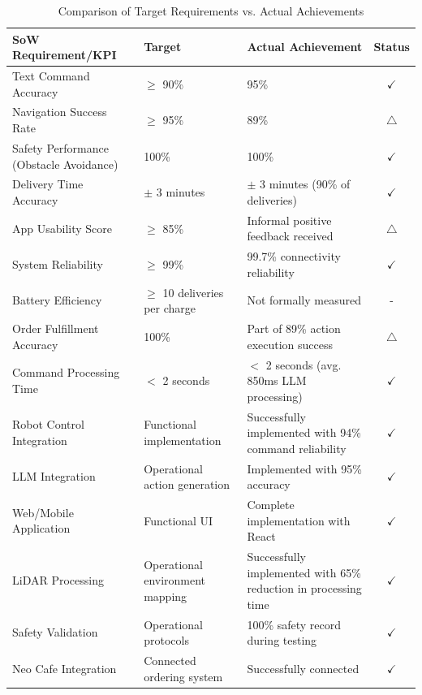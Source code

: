 \documentclass[12pt]{article}
\begin{document}
\renewcommand{\arraystretch}{1.2}
\begin{table}[h]
\centering
\begin{tabularx}{\textwidth}{|X|X|X|c|}
\hline
\textbf{SoW Requirement/KPI} & \textbf{Target} & \textbf{Actual Achievement} & \textbf{Status} \\
\hline
Text Command Accuracy & $\geq$ 90\% & 95\% & $\checkmark$ \\
\hline
Navigation Success Rate & $\geq$ 95\% & 89\% & $\triangle$ \\
\hline
Safety Performance (Obstacle Avoidance) & 100\% & 100\% & $\checkmark$ \\
\hline
Delivery Time Accuracy & $\pm$ 3 minutes & $\pm$ 3 minutes (90\% of deliveries) & $\checkmark$ \\
\hline
App Usability Score & $\geq$ 85\% & Informal positive feedback received & $\triangle$ \\
\hline
System Reliability & $\geq$ 99\% & 99.7\% connectivity reliability & $\checkmark$ \\
\hline
Battery Efficiency & $\geq$ 10 deliveries per charge & Not formally measured & - \\
\hline
Order Fulfillment Accuracy & 100\% & Part of 89\% action execution success & $\triangle$ \\
\hline
Command Processing Time & $<$ 2 seconds & $<$ 2 seconds (avg. 850ms LLM processing) & $\checkmark$ \\
\hline
Robot Control Integration & Functional implementation & Successfully implemented with 94\% command reliability & $\checkmark$ \\
\hline
LLM Integration & Operational action generation & Implemented with 95\% accuracy & $\checkmark$ \\
\hline
Web/Mobile Application & Functional UI & Complete implementation with React & $\checkmark$ \\
\hline
LiDAR Processing & Operational environment mapping & Successfully implemented with 65\% reduction in processing time & $\checkmark$ \\
\hline
Safety Validation & Operational protocols & 100\% safety record during testing & $\checkmark$ \\
\hline
Neo Cafe Integration & Connected ordering system & Successfully connected & $\checkmark$ \\
\hline
\end{tabularx}
\caption{Comparison of Target Requirements vs. Actual Achievements}
\label{tab:requirements_vs_achievements}
\end{table}
\end{document}
